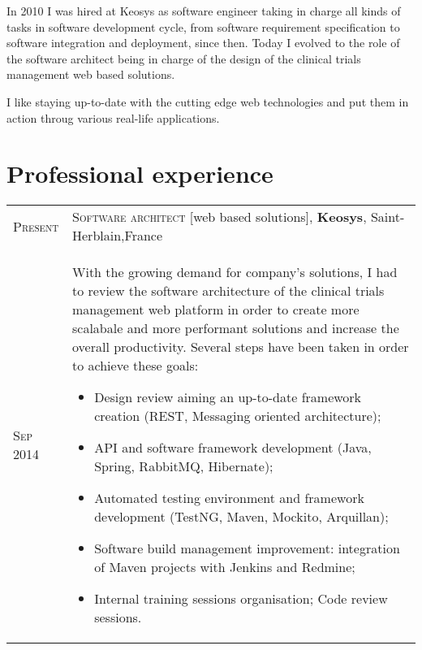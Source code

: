 \documentclass[letter,10pt]{article} %
\begin{document}
In 2010 I was hired at Keosys as software engineer taking in charge all kinds of
tasks in software development cycle, from software requirement
specification to software integration and deployment, since then. Today I
evolved to the role of the software architect being in charge of the design of the clinical trials management web based solutions.

I like staying up-to-date with the cutting edge web technologies and put them in
action throug various real-life applications.
\section{Professional experience}

\begin{tabular}{R{2cm}|p{15.5cm}}
\textsc{Present} & \textsc{Software architect} [web based solutions],
\normalsize\textbf{Keosys}, Saint-Herblain,France \\
\textsc{Sep 2014} & \vspace{-1mm} With the growing demand for company's
solutions, I had to review  the software architecture of the clinical trials
management web platform in order to create more scalabale and more performant
solutions and increase the overall productivity. Several steps have been taken in order to achieve these
goals:
\begin{itemize} 
  \item Design review aiming an up-to-date framework creation
  (REST, Messaging oriented architecture);
  \item API and software framework development (Java, Spring, RabbitMQ,
  Hibernate);
  \item Automated testing environment and framework development (TestNG,
  Maven, Mockito, Arquillan);
  \item Software build management improvement: integration of Maven projects
  with Jenkins and Redmine;
  \item Internal training sessions organisation; Code review sessions.
\end{itemize} 

\end{tabular}
\end{document}
